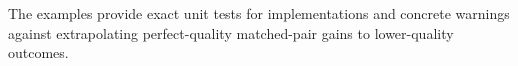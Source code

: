 The examples provide exact unit tests for implementations and concrete warnings against extrapolating perfect-quality matched-pair gains to lower-quality outcomes.